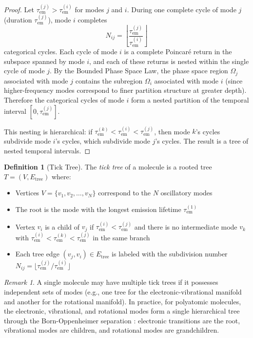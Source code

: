 \documentclass[11pt,twocolumn,a4paper]{article}
\theoremstyle{definition}
\newtheorem{definition}[theorem]{Definition}
\theoremstyle{remark}
\newtheorem{remark}[theorem]{Remark}
\newcommand{\tem}{\tau_{\mathrm{em}}}
\begin{document}
\begin{proof}
Let $\tem^{(j)} > \tem^{(i)}$ for modes $j$ and $i$. During one complete cycle of mode $j$ (duration $\tem^{(j)}$), mode $i$ completes
\begin{equation}
N_{ij} = \left\lfloor \frac{\tem^{(j)}}{\tem^{(i)}} \right\rfloor
\label{eq:subdivision}
\end{equation}
categorical cycles. Each cycle of mode $i$ is a complete Poincar\'{e} return in the subspace spanned by mode $i$, and each of these returns is nested within the single cycle of mode $j$. By the Bounded Phase Space Law, the phase space region $\Omega_j$ associated with mode $j$ contains the subregion $\Omega_i$ associated with mode $i$ (since higher-frequency modes correspond to finer partition structure at greater depth). Therefore the categorical cycles of mode $i$ form a nested partition of the temporal interval $[0, \tem^{(j)}]$.

This nesting is hierarchical: if $\tem^{(k)} < \tem^{(i)} < \tem^{(j)}$, then mode $k$'s cycles subdivide mode $i$'s cycles, which subdivide mode $j$'s cycles. The result is a tree of nested temporal intervals.
\end{proof}

\begin{definition}[Tick Tree]
\label{def:tick_tree}
The \emph{tick tree} of a molecule is a rooted tree $T = (V, E_{\mathrm{tree}})$ where:
\begin{itemize}[nosep]
\item Vertices $V = \{v_1, v_2, \ldots, v_N\}$ correspond to the $N$ oscillatory modes
\item The root is the mode with the longest emission lifetime $\tem^{(1)}$
\item Vertex $v_i$ is a child of $v_j$ if $\tem^{(i)} < \tem^{(j)}$ and there is no intermediate mode $v_k$ with $\tem^{(i)} < \tem^{(k)} < \tem^{(j)}$ in the same branch
\item Each tree edge $(v_j, v_i) \in E_{\mathrm{tree}}$ is labeled with the subdivision number $N_{ij} = \lfloor \tem^{(j)}/\tem^{(i)} \rfloor$
\end{itemize}
\end{definition}

\begin{remark}
A single molecule may have multiple tick trees if it possesses independent sets of modes (e.g., one tree for the electronic-vibrational manifold and another for the rotational manifold). In practice, for polyatomic molecules, the electronic, vibrational, and rotational modes form a single hierarchical tree through the Born-Oppenheimer separation \citep{bornoppenheimer1927}: electronic transitions are the root, vibrational modes are children, and rotational modes are grandchildren.
\end{remark}
\end{document}
